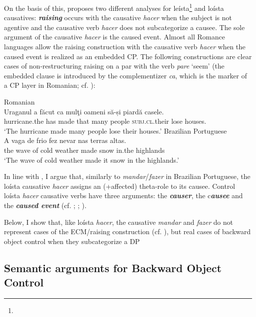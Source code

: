 \documentclass[output=paper]{langsci/langscibook}
\begin{document}
On the basis of this, \citet{Torrego2010} proposes two different analyses for leísta\footnote{} and loísta causatives: \textbf{\textit{raising}} occurs with the causative \textit{hacer} when the subject is not agentive and the causative verb \textit{hacer} does not subcategorize a causee. The sole argument of the causative \textit{hacer} is the caused event. Almost all Romance languages allow the raising construction with the causative verb \textit{hacer} when the caused event is realized as an embedded CP. The following constructions are clear cases of non-restructuring raising on a par with the verb \textit{pare} ‘seem’ (the embedded clause is introduced by the complementizer \textit{ca}, which is the marker of a CP layer in Romanian; cf. \citealt{Alboiu2007}):

\ea%
    \label{ex:moreno:8}
    \ea  Romanian\\
    \gll Uraganul    a    făcut   ca   mulţi  oameni  să-și              piardă casele.   \\
         hurricane.the has made  that many people   \textsc{subj.cl}.their lose     houses. \\
    \glt ‘The hurricane made many people lose their houses.’
    \ex  Brazilian Portuguese\\
    \gll A   vaga  de frio     fez   nevar   nas     terras altas.  \\
         the wave of cold weather   made  snow  in.the highlands\\
    \glt ‘The wave of cold weather made it snow in the highlands.’ 
    \z
\z

In line with \citet{López2001}, I argue that, similarly to \textit{mandar}/\textit{fazer} in Brazilian Portuguese, the loísta causative \textit{hacer} assigns an (+affected) theta-role to its causee. Control loísta \textit{hacer} causative verbs have three arguments: the \textbf{\textit{causer}}, the c\textbf{\textit{ausee} }and the \textbf{\textit{caused event}} (cf. \citealt{Zubizarreta1985}; \citealt{Alsina1992}; \citealt{Ippolito2000}). 

Below, I show that, like loísta \textit{hacer}, the causative \textit{mandar} and \textit{fazer} do not represent cases of the ECM/raising construction (cf. \citealt{Farrell1995}), but real cases of backward object control when they subcategorize a DP

\subsection{Semantic arguments for Backward Object Control} %
\end{document}
